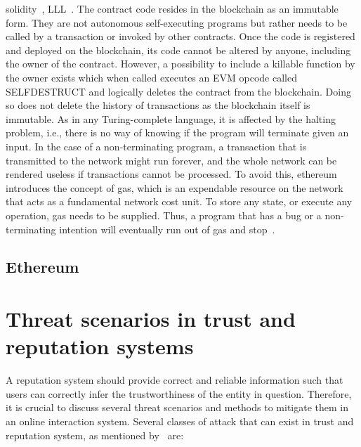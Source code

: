 solidity~\cite{SolidityDocs}, LLL~\cite{LLL}.  The contract code resides in the
blockchain as an immutable form.  They are not autonomous self-executing
programs but rather needs to be called by a transaction or invoked by other
contracts. Once the code is registered and deployed on the blockchain, its code
cannot be altered by anyone, including the owner of the contract. However, a
possibility to include a killable function by the owner exists which when
called executes an EVM opcode called SELFDESTRUCT and logically deletes the
contract from the blockchain. Doing so does not delete the history of
transactions as the blockchain itself is immutable. As in any Turing-complete
language, it is affected by the halting problem, i.e., there is no way of
knowing if the program will terminate given an input. In the case of a
non-terminating program, a transaction that is transmitted to the network might
run forever, and the whole network can be rendered useless if transactions
cannot be processed. To avoid this, ethereum introduces the concept of gas,
which is an expendable resource on the network that acts as a fundamental
network cost unit. To store any state, or execute any operation, gas needs to
be supplied. Thus, a program that has a bug or a non-terminating intention will
eventually run out of gas and stop~\cite{whataresmartcontracts}. 
\subsection{Ethereum} \label{subsec:ethereum}

\section{Threat scenarios in trust and reputation systems}
A reputation system should provide correct and reliable information such that
users can correctly infer the trustworthiness of the entity in question.
Therefore, it is crucial to discuss several threat scenarios and methods to
mitigate them in an online interaction system. Several classes of attack that
can exist in trust and reputation system, as mentioned
by~\cite{hoffman2009survey,marmol2009security} are:  
